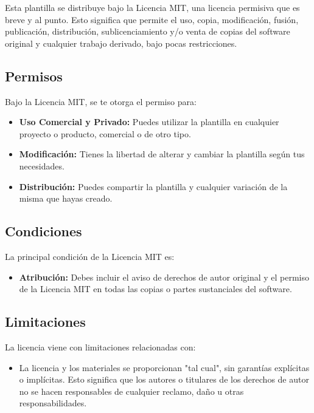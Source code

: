 \documentclass[11pt]{article}
\begin{document}
Esta plantilla se distribuye bajo la Licencia MIT, una licencia permisiva que es breve y al punto. Esto significa que permite el uso, copia, modificación, fusión, publicación, distribución, sublicenciamiento y/o venta de copias del software original y cualquier trabajo derivado, bajo pocas restricciones.

\subsection{Permisos}

Bajo la Licencia MIT, se te otorga el permiso para:

\begin{itemize}
\item \textbf{Uso Comercial y Privado:} Puedes utilizar la plantilla en cualquier proyecto o producto, comercial o de otro tipo.
\item \textbf{Modificación:} Tienes la libertad de alterar y cambiar la plantilla según tus necesidades.
\item \textbf{Distribución:} Puedes compartir la plantilla y cualquier variación de la misma que hayas creado.
\end{itemize}

\subsection{Condiciones}

La principal condición de la Licencia MIT es:

\begin{itemize}
\item \textbf{Atribución:} Debes incluir el aviso de derechos de autor original y el permiso de la Licencia MIT en todas las copias o partes sustanciales del software.
\end{itemize}

\subsection{Limitaciones}

La licencia viene con limitaciones relacionadas con:

\begin{itemize}
\item La licencia y los materiales se proporcionan "tal cual", sin garantías explícitas o implícitas. Esto significa que los autores o titulares de los derechos de autor no se hacen responsables de cualquier reclamo, daño u otras responsabilidades.
\end{itemize}
\end{document}
